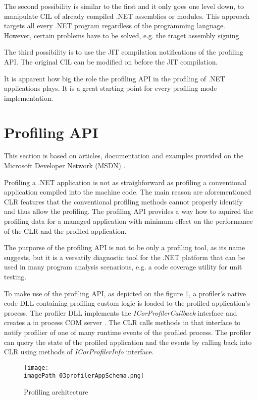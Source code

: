 The second possibility is similar to the first and it only goes one level down, to manipulate CIL of already compiled .NET assemblies or modules. This approach targets all every .NET program regardless of the programming language. However, certain problems have to be solved, e.g. the traget assembly signing.

The third possibility is to use the JIT compilation notifications of the profiling API. The original CIL can be modified on before the JIT compilation.

It is apparent how big the role the profiling API in the profiling of .NET applications plays. It is a great starting point for every profiling mode implementation.

\section{Profiling API}
This section is based on articles, documentation and examples provided on the Microsoft Developer Network (MSDN) \cite{ProfMSDN}.

Profiling a .NET application is not as straighforward as profiling a conventional application compiled into the machine code. The main reason are aforementioned CLR features that the conventional profiling methods cannot properly identify and thus allow the profiling. The profiling API provides a way how to aquired the profiling data for a managed application with minimum effect on the performance of the CLR and the profiled application. 

The purporse of the profiling API is not to be only a profiling tool, as its name suggests, but it is a versatily diagnostic tool for the .NET platform that can be used in many program analysis scenarious, e.g. a code coverage utility for unit testing.

To make use of the profiling API, as depicted on the figure \ref{fig:03profilerAppSchema}, a profiler's native code DLL containing profiling custom logic is loaded to the profiled application's process. The profiler DLL implements the \textit{ICorProfilerCallback} interface and creates a in process COM server . The CLR calls methods in that interface to notify profilier of one of many runtime events of the profiled process. The profiler can query the state of the profiled application and the events by calling back into CLR using methods of \textit{ICorProfilerInfo} interface.

\begin{figure}
	\centering
		\texttt{[image: \\imagePath 03profilerAppSchema.png]}
		\caption{Profiling architecture \cite{ProfMSDN} }
	\label{fig:03profilerAppSchema}
\end{figure}

